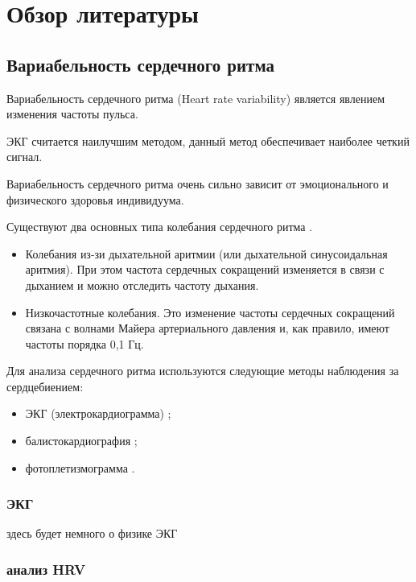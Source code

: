 \chapter{Обзор литературы}

\section{Вариабельность сердечного ритма }

Вариабельность сердечного ритма (Heart rate variability) является явлением изменения частоты пульса.


ЭКГ считается наилучшим методом, данный метод обеспечивает наиболее четкий сигнал.

Вариабельность сердечного ритма очень сильно зависит от эмоционального \cite{hrv_and_sensitivity, hrv_and_respiratory} и физического \cite{hrv_and_phisical_health} здоровья индивидуума.

Существуют два основных типа колебания сердечного ритма \cite{two_rates_hrv}.

\begin{itemize}
	\item Колебания из-зи дыхательной аритмии (или дыхательной синусоидальная аритмия). При этом частота сердечных сокращений изменяется в связи с дыханием и можно отследить частоту дыхания.
	\item Низкочастотные колебания. Это изменение частоты сердечных сокращений связана с волнами Майера \cite{mayer_wave} артериального давления и, как правило, имеют частоты порядка 0,1 Гц.
\end{itemize}

Для анализа сердечного ритма используются следующие методы наблюдения за сердцебиением:

\begin{itemize}
	\item ЭКГ (электрокардиограмма) \cite{EKG};
	\item балистокардиография  \cite{Ballistocardiograms};
	\item фотоплетизмограмма \cite{Photoplethysmography}.
\end{itemize}

\subsection{ЭКГ}

здесь будет немного о физике ЭКГ

\subsection{анализ HRV}

